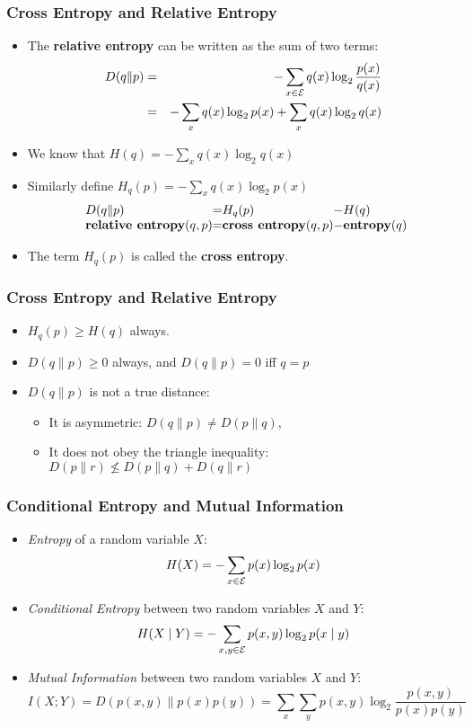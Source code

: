 \begin{frame}
\frametitle{Cross Entropy and Relative Entropy}
\begin{itemize}[<+->]
\item The {\bf relative entropy} can be written as the sum of two terms:
\begin{eqnarray*}
D(q \| p) & = & - \sum_{x \in {\cal E}} q(x) \log_2 \frac{p(x)}{q(x)} \\
& = & - \sum_{x} q(x) \log_2 p(x) + \sum_{x} q(x) \log_2 q(x) 
\end{eqnarray*}
\item We know that $H(q) = - \sum_{x} q(x) \log_2 q(x)$
\item Similarly define $H_{q}(p) = - \sum_{x} q(x) \log_2 p(x)$
\[
\begin{array}{l@{}c@{}l@{}c@{}l@{}}
D(q \| p) & = & H_{q}(p) & - & H(q) \\
\textbf{relative entropy}(q, p) & = & \textbf{cross entropy}(q, p) & - & \textbf{entropy}(q) 
\end{array}
\]
\item The term $H_{q}(p)$ is called the {\bf cross entropy}.
\end{itemize}

\end{frame}

\begin{frame}
\frametitle{Cross Entropy and Relative Entropy}
\begin{itemize}[<+->]
\item $H_{q}(p) \geq H(q)$ always.
\item $D(q \| p) \geq 0$ always, and $D(q \| p) = 0$ iff $q = p$
\item $D(q \| p)$ is not a true distance: 
  \begin{itemize}
  \item It is asymmetric: $D(q \| p) \neq D(p \| q)$, 
  \item It does not obey the triangle inequality: $D(p \| r) \nleq D(p \| q) + D(q \| r)$
  \end{itemize}
\end{itemize}

\end{frame}

\begin{frame}
\frametitle{Conditional Entropy and Mutual Information}
\begin{itemize}[<+->]
\item {\it Entropy} of a random variable $X$:
\[ H(X) = - \sum_{x \in {\cal E}} p(x) \log_2 p(x) \]
\item {\it Conditional Entropy} between two random variables $X$ and $Y$:
\[ H(X \mid Y) = - \sum_{x,y \in {\cal E}} p(x,y) \log_2 p(x
\mid y) \]
\item {\it Mutual Information} between two random variables $X$ and $Y$:
\[ I(X;Y) = D(p(x,y) \| p(x)p(y)) = \sum_x \sum_y p(x,y) \log_2
\frac{p(x,y)}{p(x)p(y)} \]
\end{itemize}

\end{frame}

